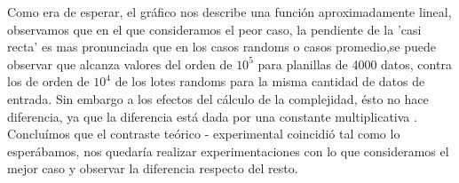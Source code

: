 Como era de esperar, el gráfico nos describe una función aproximadamente lineal, observamos que en el que consideramos el peor caso, la pendiente de la 'casi recta' es mas pronunciada que en los casos randoms o casos promedio,se puede observar que alcanza valores del orden de $10^{5}$ para planillas de 4000 datos, contra los de orden de $10^{4}$ de los lotes randoms para la misma cantidad de datos de entrada. 
\newline
Sin embargo a los efectos del cálculo de la complejidad, ésto no hace diferencia, ya que la diferencia está dada por una constante multiplicativa .
\newline
Concluímos que el contraste teórico - experimental coincidió tal como lo esperábamos, nos quedaría realizar experimentaciones con lo que consideramos el mejor caso y observar la diferencia respecto del resto.


